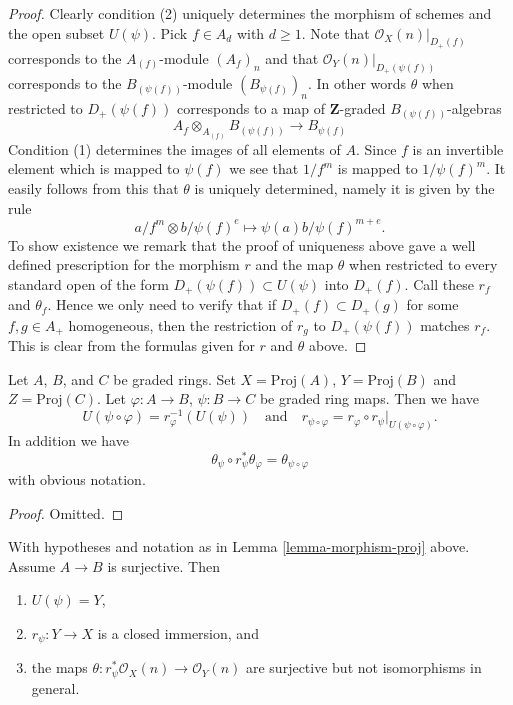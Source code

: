 \begin{proof}
Clearly condition (2) uniquely determines the morphism of schemes
and the open subset $U(\psi)$. Pick $f \in A_d$ with $d \geq 1$.
Note that
$\mathcal{O}_X(n)|_{D_{+}(f)}$ corresponds to the
$A_{(f)}$-module $(A_f)_n$ and that
$\mathcal{O}_Y(n)|_{D_{+}(\psi(f))}$ corresponds to the
$B_{(\psi(f))}$-module $(B_{\psi(f)})_n$. In other words $\theta$
when restricted to $D_{+}(\psi(f))$ corresponds to a map of
$\mathbf{Z}$-graded $B_{(\psi(f))}$-algebras
$$
A_f \otimes_{A_{(f)}} B_{(\psi(f))} 
\longrightarrow
B_{\psi(f)}
$$
Condition (1) determines the images of all elements of $A$.
Since $f$ is an invertible element which is mapped to $\psi(f)$
we see that $1/f^m$ is mapped to $1/\psi(f)^m$. It easily follows
from this that $\theta$ is uniquely determined, namely it is
given by the rule
$$
a/f^m \otimes b/\psi(f)^e \longmapsto \psi(a)b/\psi(f)^{m + e}.
$$
To show existence we remark that the proof of uniqueness above gave
a well defined prescription for the morphism $r$ and the map $\theta$
when restricted to every standard open of the form
$D_{+}(\psi(f)) \subset U(\psi)$ into $D_{+}(f)$.
Call these $r_f$ and $\theta_f$.
Hence we only need to verify that if $D_{+}(f) \subset D_{+}(g)$
for some $f, g \in A_{+}$ homogeneous, then the restriction of
$r_g$ to $D_{+}(\psi(f))$ matches $r_f$. This is clear from the
formulas given for $r$ and $\theta$ above.
\end{proof}

\begin{lemma}
\label{lemma-morphism-proj-transitive}
Let $A$, $B$, and $C$ be graded rings.
Set $X = \text{Proj}(A)$, $Y = \text{Proj}(B)$ and $Z = \text{Proj}(C)$.
Let $\varphi : A \to B$, $\psi : B \to C$ be graded ring maps.
Then we have
$$
U(\psi \circ \varphi) = r_\varphi^{-1}(U(\psi))
\quad
\text{and}
\quad
r_{\psi \circ \varphi}
=
r_\varphi \circ r_\psi|_{U(\psi \circ \varphi)}.
$$
In addition we have
$$
\theta_\psi \circ r_\psi^*\theta_\varphi
=
\theta_{\psi \circ \varphi}
$$
with obvious notation.
\end{lemma}

\begin{proof}
Omitted.
\end{proof}

\begin{lemma}
\label{lemma-surjective-graded-rings-map-proj}
With hypotheses and notation as in Lemma \ref{lemma-morphism-proj} above.
Assume $A \to B$ is surjective. Then
\begin{enumerate}
\item $U(\psi) = Y$,
\item $r_\psi : Y \to X$ is a closed immersion, and
\item the maps $\theta : r_\psi^*\mathcal{O}_X(n) \to \mathcal{O}_Y(n)$
are surjective but not isomorphisms in general.
\end{enumerate}
\end{lemma}

